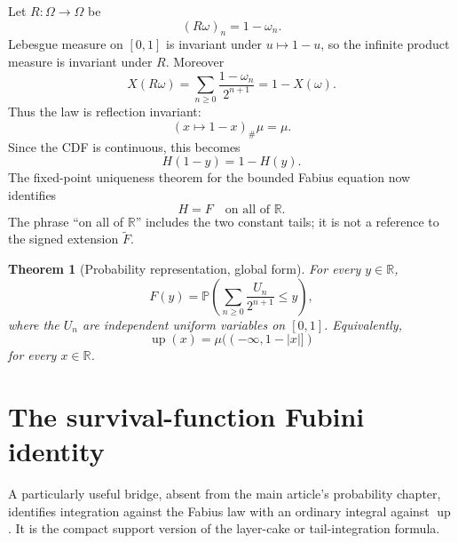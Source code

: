 \documentclass[11pt,oneside]{article}
\newtheorem{theorem}{Theorem}[section]
\theoremstyle{definition}
\theoremstyle{remark}
\newcommand{\R}{\mathbb R}
\newcommand{\Up}{\operatorname{up}}
\newcommand{\Prob}{\mathbb P}
\begin{document}
Let $R:\Omega\to\Omega$ be
\begin{equation}
 (R\omega)_n=1-\omega_n.
 \label{eq:coordinate-reflection}
\end{equation}
Lebesgue measure on $[0,1]$ is invariant under $u\mapsto1-u$, so the infinite product measure
is invariant under $R$.  Moreover
\begin{equation}
 X(R\omega)=\sum_{n\ge0}\frac{1-\omega_n}{2^{n+1}}
 =1-X(\omega).
 \label{eq:X-reflection}
\end{equation}
Thus the law is reflection invariant:
\begin{equation}
 (x\mapsto1-x)_\#\mu=\mu.
 \label{eq:law-reflection}
\end{equation}
Since the CDF is continuous, this becomes
\begin{equation}
 H(1-y)=1-H(y).
 \label{eq:CDF-reflection}
\end{equation}
The fixed-point uniqueness theorem for the bounded Fabius equation now identifies
\begin{equation}
 H=F
 \quad\text{on all of }\R.
 \label{eq:CDF-is-F}
\end{equation}
The phrase ``on all of $\R$'' includes the two constant tails; it is not a reference to the
signed extension $\widetilde F$.

\begin{theorem}[Probability representation, global form]
\label{thm:probability-representation-global}
For every $y\in\R$,
\begin{equation}
 F(y)=\Prob\!\left(\sum_{n\ge0}\frac{U_n}{2^{n+1}}\le y\right),
 \label{eq:F-as-CDF-global}
\end{equation}
where the $U_n$ are independent uniform variables on $[0,1]$.  Equivalently,
\begin{equation}
 \Up(x)=\mu(({-\infty},1-|x|])
 \label{eq:up-as-CDF-global}
\end{equation}
for every $x\in\R$.
\end{theorem}

\section{The survival-function Fubini identity}
\label{sec:survival-fubini}

A particularly useful bridge, absent from the main article's probability chapter, identifies
integration against the Fabius law with an ordinary integral against $\Up$.  It is the compact
support version of the layer-cake or tail-integration formula.
\end{document}
